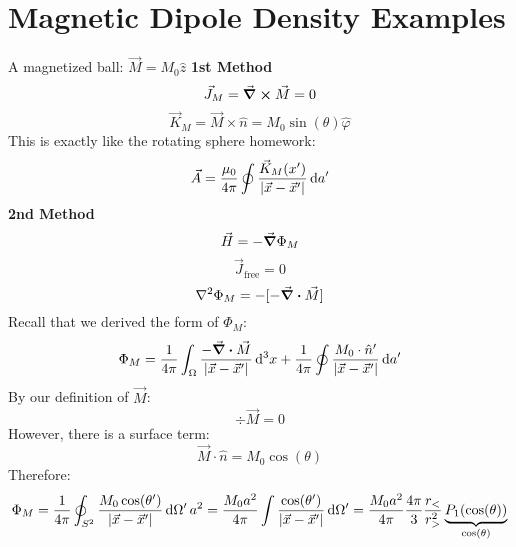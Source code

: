 \documentclass[a4paper,twoside,master.tex]{subfiles}
\begin{document}
\section{Magnetic Dipole Density Examples}
\label{sec:magnetic_dipole_density_examples}
\begin{ex}
    A magnetized ball: $ \vec{M} = M_0 \hat{z} $
    \textbf{1st Method}
    \begin{equation}
        \vec{J}_M = \curl{ \vec{M}} = 0
    \end{equation}
    \begin{equation}
        \vec{K}_M = \vec{M} \times \hat{n} = M_0 \sin(\theta) \hat{\varphi}
    \end{equation}
    This is exactly like the rotating sphere homework:
    \begin{equation}
        \vec{A} = \frac{\mu_0}{4 \pi} \oint \frac{ \vec{K}_M(x')}{\abs{ \vec{x} - \vec{x}'}} \dd{a'}
    \end{equation}
    \textbf{2nd Method}
    \begin{equation}
        \vec{H} = - \grad{\Phi_M}
    \end{equation}
    \begin{equation}
        \vec{J}_{\text{free}} = 0
    \end{equation}
    \begin{equation}
        \laplacian{\Phi_M} = -[- \div{ \vec{M}} ]
    \end{equation}
    Recall that we derived the form of $ \Phi_M $:
    \begin{equation}
        \Phi_M = \frac{1}{4 \pi} \int_{\Omega} \frac{- \div{ \vec{M}}}{\abs{ \vec{x} - \vec{x}'}} \dd[3]{x} + \frac{1}{4 \pi}\oint \frac{M_0 \cdot \hat{n}'}{\abs{ \vec{x} - \vec{x}'}} \dd{a'}
    \end{equation}
    By our definition of $ \vec{M} $:
    \begin{equation}
        \div{ \vec{M}} = 0
    \end{equation}
    However, there is a surface term:
    \begin{equation}
        \vec{M} \cdot \hat{n} = M_0 \cos(\theta)
    \end{equation}
    Therefore:
    \begin{equation}
        \Phi_M = \frac{1}{4 \pi}\oint_{S^2} \frac{M_0 \cos(\theta')}{\abs{ \vec{x} - \vec{x}'}} \dd{\Omega'} a^2 = \frac{M_0 a^2}{4 \pi} \int \frac{\cos(\theta')}{\abs{ \vec{x} - \vec{x}'}} \dd{\Omega'} = \frac{M_0 a^2}{4 \pi} \frac{4 \pi}{3} \frac{r_<}{r_>^2} \underbrace{P_1(\cos(\theta))}_{\cos(\theta)}

\end{equation}
\end{ex}
\end{document}
